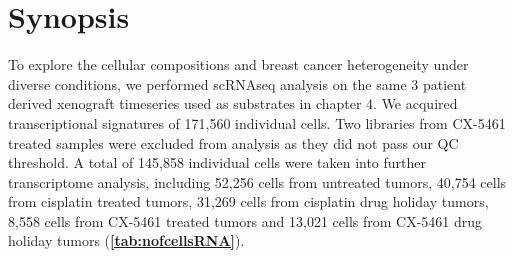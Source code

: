 


 \section{Synopsis}

 
To explore the cellular compositions and breast cancer heterogeneity under diverse conditions, we performed scRNAseq analysis on the same 3 patient derived xenograft timeseries used as substrates in chapter 4. We acquired transcriptional signatures of 171,560 individual cells. Two libraries from CX-5461 treated samples were excluded from analysis as they did not pass our QC threshold. A total of 145,858 individual cells were taken into further transcriptome analysis, including  52,256 cells from untreated tumors, 40,754 cells from cisplatin treated tumors, 31,269 cells from cisplatin drug holiday tumors, 8,558 cells from CX-5461 treated tumors and 13,021 cells from CX-5461 drug holiday tumors (\textbf{\autoref{tab:nofcellsRNA}}).

